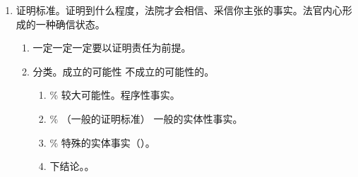\begin{enumerate}
\begin{enumerate}
\begin{enumerate}
\begin{enumerate}
                          \item 选项基本都表述成了“xx 的事实的证明责任由 xx 承担”。
                          \item {}。
                          \item {}。
                          \item {}。
                          \item {}。
                          \item {}。
                        \end{enumerate}
                        
                \end{enumerate}
          \item 陷阱。拿不是本案的证明对象，问你证明责任。
                \begin{enumerate}
                  \item {}。
                  \item {}。
                \end{enumerate}
        \end{enumerate}
  \item 证明标准。证明到什么程度，法院才会相信、采信你主张的事实。法官内心形成的一种确信状态。
        \begin{enumerate}
          \item 一定一定一定要以证明责任为前提。
          \item 分类。成立的可能性 \dy 不成立的可能性的。
                \begin{enumerate}
                  \item {}\% \yjt 较大可能性。程序性事实。
                  \item {}\% \yjt {}（一般的证明标准） \yjt 一般的实体性事实。
                  \item {}\% \yjt {} \yjt 特殊的实体事实（）。
                  \item 下结论。。
                \end{enumerate}
        \end{enumerate}
\end{enumerate}
